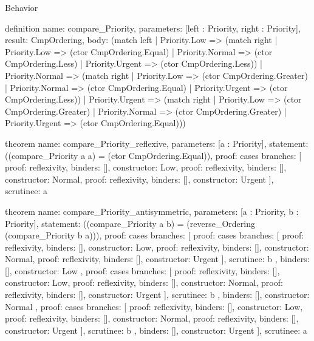 \begin{lexlean}{Behavior}
\begin{semanticmodule}
definition{
  name: compare_Priority,
  parameters: [left : Priority, right : Priority],
  result: CmpOrdering,
  body: (match left
    | Priority.Low => (match right
      | Priority.Low => (ctor CmpOrdering.Equal)
      | Priority.Normal => (ctor CmpOrdering.Less)
      | Priority.Urgent => (ctor CmpOrdering.Less))
    | Priority.Normal => (match right
      | Priority.Low => (ctor CmpOrdering.Greater)
      | Priority.Normal => (ctor CmpOrdering.Equal)
      | Priority.Urgent => (ctor CmpOrdering.Less))
    | Priority.Urgent => (match right
      | Priority.Low => (ctor CmpOrdering.Greater)
      | Priority.Normal => (ctor CmpOrdering.Greater)
      | Priority.Urgent => (ctor CmpOrdering.Equal)))
}

theorem{
  name: compare_Priority_reflexive,
  parameters: [a : Priority],
  statement: ((compare_Priority a a) = (ctor CmpOrdering.Equal)),
  proof: cases{
    branches: [
      {proof: reflexivity{}, binders: [], constructor: Low},
      {proof: reflexivity{}, binders: [], constructor: Normal},
      {proof: reflexivity{}, binders: [], constructor: Urgent}
    ],
    scrutinee: a
  }
}

theorem{
  name: compare_Priority_antisymmetric,
  parameters: [a : Priority, b : Priority],
  statement: ((compare_Priority a b) = (reverse_Ordering (compare_Priority b a))),
  proof: cases{
    branches: [
      {
        proof: cases{
          branches: [
            {proof: reflexivity{}, binders: [], constructor: Low},
            {proof: reflexivity{}, binders: [], constructor: Normal},
            {proof: reflexivity{}, binders: [], constructor: Urgent}
          ],
          scrutinee: b
        },
        binders: [],
        constructor: Low
      },
      {
        proof: cases{
          branches: [
            {proof: reflexivity{}, binders: [], constructor: Low},
            {proof: reflexivity{}, binders: [], constructor: Normal},
            {proof: reflexivity{}, binders: [], constructor: Urgent}
          ],
          scrutinee: b
        },
        binders: [],
        constructor: Normal
      },
      {
        proof: cases{
          branches: [
            {proof: reflexivity{}, binders: [], constructor: Low},
            {proof: reflexivity{}, binders: [], constructor: Normal},
            {proof: reflexivity{}, binders: [], constructor: Urgent}
          ],
          scrutinee: b
        },
        binders: [],
        constructor: Urgent
      }
    ],
    scrutinee: a
  }
}


\end{semanticmodule}
\end{lexlean}
